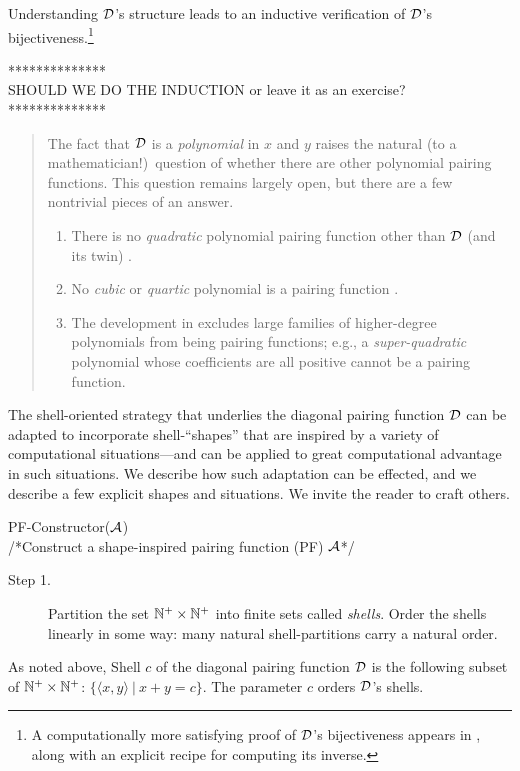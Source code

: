 Understanding $\mbox{$\cal D$}$'s structure leads to an inductive verification of
$\mbox{$\cal D$}$'s bijectiveness.\footnote{A computationally more satisfying proof
  of $\mbox{$\cal D$}$'s bijectiveness appears in \cite{Davis58}, along with an
  explicit recipe for computing its inverse.}

\noindent
************** \\
{\Arny SHOULD WE DO THE INDUCTION or leave it as an exercise?} \\
**************

\begin{quote}
The fact that $\mbox{$\cal D$}$ is a {\em polynomial} in $x$ and $y$ raises the
natural (to a mathematician!)~question of whether there are other
polynomial pairing functions.  This question remains largely open, but
there are a few nontrivial pieces of an answer.
\begin{enumerate}
\item
There is no {\em quadratic} polynomial pairing function other than
$\mbox{$\cal D$}$ (and its twin) \cite{FueterP23,LewR78a}.
\item
No {\em cubic} or {\em quartic} polynomial is a pairing function
\cite{LewR78b}.
\item
The development in \cite{LewR78b} excludes large families of
higher-degree polynomials from being pairing functions; e.g., a {\em
  super-quadratic} polynomial whose coefficients are all positive
cannot be a pairing function.
\end{enumerate}
\end{quote}


\medskip

%
The shell-oriented strategy that underlies the diagonal pairing
function $\mbox{$\cal D$}$ can be adapted to incorporate shell-``shapes'' that are
inspired by a variety of computational situations---and can be applied
to great computational advantage in such situations.  We describe how
such adaptation can be effected, and we describe a few explicit shapes
and situations.  We invite the reader to craft others.

\medskip

 {\small\sf PF-Constructor}($\mbox{$\cal A$}$) \\
/*Construct a shape-inspired pairing function (PF) $\mbox{$\cal A$}$*/
\begin{description}
\item[Step 1.]
%
Partition the set $\mathbb{N}^+ \times \mathbb{N}^+$ into finite sets called {\it
  shells}.  Order the shells linearly in some way: many natural
shell-partitions carry a natural order.
\end{description}
As noted above, Shell $c$ of the diagonal pairing function $\mbox{$\cal D$}$ is the
following subset of $\mathbb{N}^+ \times \mathbb{N}^+$: $\{ \langle x,y \rangle \ |
\ x+y = c \}$.  The parameter $c$ orders $\mbox{$\cal D$}$'s shells.

